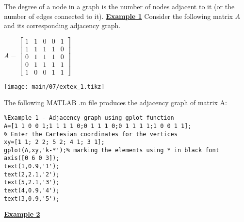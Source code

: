 The degree of a node in a graph is the number of nodes adjacent to it (or the
number of edges connected to it).
\noindent
\vskip 10pt
\noindent
{\bf\underline {Example 1}}
\vskip 10pt
\noindent
Consider the following matrix $A$ and its corresponding adjacency graph.
\begin{table}[H]
  \begin{minipage}[b]{0.50\linewidth}\centering
    \vskip 10pt
    $A=
    \begin{bmatrix}
      1 & 1 & 0 & 0 & 1 \\
      1 & 1 & 1 & 1 & 0 \\
      0 & 1 & 1 & 1 & 0 \\
      0 & 1 & 1 & 1 & 1 \\
      1 & 0 & 0 & 1 & 1
    \end{bmatrix}$
    \vspace{5mm}
  \end{minipage}
  \begin{minipage}[b]{0.49\linewidth}
    \texttt{[image: main/07/extex\_1.tikz]}
  \end{minipage}
\end{table}
\vskip7mm
\noindent
The following MATLAB .m file produces the adjacency graph of matrix A:

\noindent
{\small
\begin{lstlisting}
%Example 1 - Adjacency graph using gplot function
A=[1 1 0 0 1;1 1 1 1 0;0 1 1 1 0;0 1 1 1 1;1 0 0 1 1];
% Enter the Cartesian coordinates for the vertices
xy=[1 1; 2 2; 5 2; 4 1; 3 1];
gplot(A,xy,'k-*');% marking the elements using * in black font
axis([0 6 0 3]);
text(1,0.9,'1');
text(2,2.1,'2');
text(5,2.1,'3');
text(4,0.9,'4');
text(3,0.9,'5');		
\end{lstlisting}}

\newpage
{\bf\underline {Example 2}}

